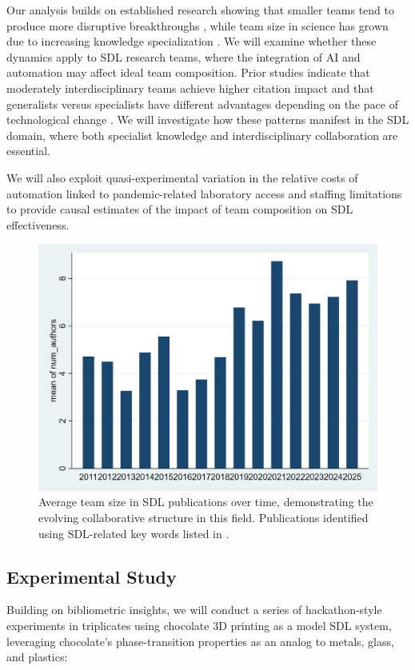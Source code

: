 \documentclass[11pt,letterpaper,twocolumn]{article}
\begin{document}
Our analysis builds on established research showing that smaller teams tend to produce more disruptive breakthroughs \cite{wu2019large}, while team size in science has grown due to increasing knowledge specialization \cite{jones2009burden}. We will examine whether these dynamics apply to SDL research teams, where the integration of AI and automation may affect ideal team composition. Prior studies indicate that moderately interdisciplinary teams achieve higher citation impact \cite{yegros2015does} and that generalists versus specialists have different advantages depending on the pace of technological change \cite{teodoridis2019creativity}. We will investigate how these patterns manifest in the SDL domain, where both specialist knowledge and interdisciplinary collaboration are essential.

We will also exploit quasi-experimental variation in the relative costs of automation linked to pandemic-related laboratory access and staffing limitations to provide causal estimates of the impact of  team composition on SDL effectiveness.
\begin{figure}[H]
    \centering
    \includegraphics[width=0.9\linewidth]{num_authors.png}
    \caption{\small Average team size in SDL publications over time, demonstrating the evolving collaborative structure in this field. Publications identified using SDL-related key words listed in \cite{sterling2024}.}
    \label{fig:team_size}
\end{figure}

\subsection{Experimental Study}
Building on bibliometric insights, we will conduct a series of hackathon-style experiments in triplicates using chocolate 3D printing as a model SDL system, leveraging chocolate's phase-transition properties as an analog to metals, glass, and plastics:
\end{document}
